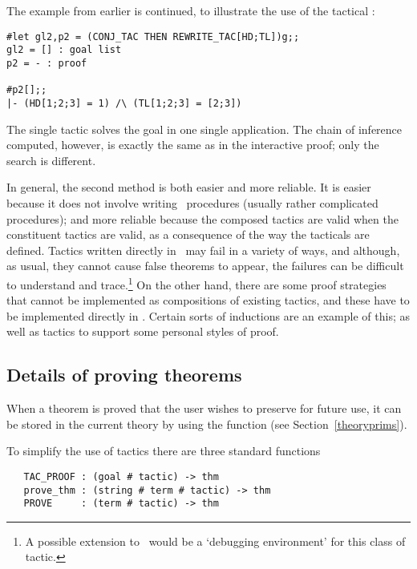 The example from earlier
is continued, to illustrate the use of the tactical :

\begin{session}\begin{verbatim}
#let gl2,p2 = (CONJ_TAC THEN REWRITE_TAC[HD;TL])g;;
gl2 = [] : goal list
p2 = - : proof

#p2[];;
|- (HD[1;2;3] = 1) /\ (TL[1;2;3] = [2;3])
\end{verbatim}\end{session}

\noindent The single tactic 
solves the goal in one single application. The chain of inference computed,
however, is exactly the same as in the interactive proof; only the search is
different.

In general, the second method is both easier and more reliable.  It is
easier because it does not involve writing \ML\ procedures (usually
rather complicated procedures); and more reliable because
the composed tactics are valid
 when the constituent tactics are valid,
as a consequence of the way the tacticals are defined. Tactics written
directly in \ML\ may fail
 in a variety of ways, and although, as usual,
they cannot cause false theorems to appear, the failures can be difficult
to understand and trace.\footnote{A possible extension to \HOL\
would be a `debugging environment' for this class of tactic.} On the other
hand, there are some proof strategies that cannot be implemented as
compositions of existing tactics, and these have to be implemented
directly in \ML.  Certain sorts of inductions are an example of this;
as well as tactics to support some personal styles of proof.



\subsection{Details of proving theorems}
\label{using-tactics}

When a theorem is proved that the user wishes to preserve for future use,
it can be stored in the current theory 
by using the function  (see Section~\ref{theoryprims}).

To simplify the use of tactics there are three standard functions

\begin{boxed}\begin{verbatim}
   TAC_PROOF : (goal # tactic) -> thm
   prove_thm : (string # term # tactic) -> thm
   PROVE     : (term # tactic) -> thm
\end{verbatim}\end{boxed}

